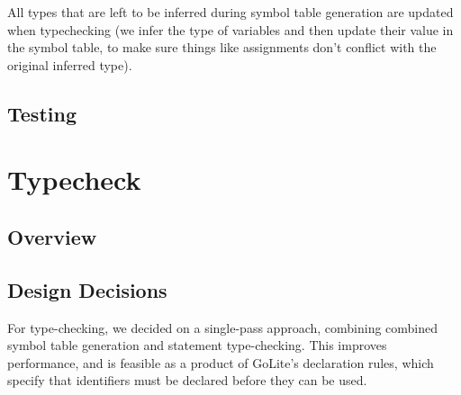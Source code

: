 \documentclass[11pt]{article}
\begin{document}
All types that are left to be inferred during symbol table
generation are updated when typechecking (we infer the type of
variables and then update their value in the symbol table, to make
sure things like assignments don't conflict with the original
inferred type).

\subsection{Testing}
\section{Typecheck}
\subsection{Overview}
\subsection{Design Decisions}
For type-checking, we decided on a single-pass approach, combining
combined symbol table generation and statement type-checking. This
improves performance, and is feasible as a product of GoLite's
declaration rules, which specify that identifiers must be declared
before they can be used.
\end{document}
